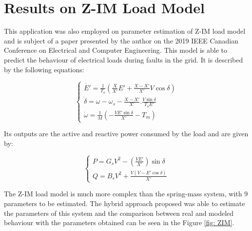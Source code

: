 \section{Results on Z-IM Load Model}

This application was also employed on parameter estimation of Z-IM load model and is subject of a paper presented by the author on the 2019 IEEE Canadian Conference on Electrical and Computer Engineering. This model is able to predict the behaviour of electrical loads during faults in the grid. It is described by the following equations:

\begin{equation}
    \begin{cases}
        \dot{E'} = \frac{1}{T_o}\left(\frac{X}{X'}E' + \frac{X - X'}{X'}V\cos\delta\right) \\
        \dot{\delta} = \omega - \omega_s - \frac{X - X'}{X'}.\frac{V\sin\delta}{T_o E'} \\
        \dot{\omega} = \frac{1}{M}\left(-\frac{VE'\sin\delta}{X'} - T_m\right)
    \end{cases}
    \label{eq: xZIM}
\end{equation}

Its outputs are the active and reactive power consumed by the load and are given by:

\begin{equation}
    \begin{cases}
        P = G_sV^2 - \left(\frac{VE'}{X'}\right)\sin\delta \\
        Q = B_sV^2 + \frac{V(V - E'\cos\delta)}{X'}
    \end{cases}
    \label{eq: yZIM}
\end{equation}

The Z-IM load model is much more complex than the spring-mass system, with 9 parameters to be estimated. The hybrid approach proposed was able to estimate the parameters of this system and the comparison between real and modeled behaviour with the parameters obtained can be seen in the Figure \ref{fig: ZIM}.

